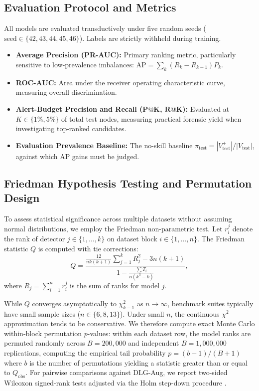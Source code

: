 \documentclass[11pt,a4paper]{article}
\begin{document}
\subsection{Evaluation Protocol and Metrics}
All models are evaluated transductively under five random seeds ($\text{seed} \in \{42, 43, 44, 45, 46\}$). Labels are strictly withheld during training.
\begin{itemize}
    \item \textbf{Average Precision (PR-AUC):} Primary ranking metric, particularly sensitive to low-prevalence imbalances: $\mathrm{AP} = \sum_k (R_k - R_{k-1}) P_k$.
    \item \textbf{ROC-AUC:} Area under the receiver operating characteristic curve, measuring overall discrimination.
    \item \textbf{Alert-Budget Precision and Recall ($\mathbf{P@K}$, $\mathbf{R@K}$):} Evaluated at $K \in \{1\%, 5\%\}$ of total test nodes, measuring practical forensic yield when investigating top-ranked candidates.
    \item \textbf{Evaluation Prevalence Baseline:} The no-skill baseline $\pi_{\mathrm{test}} = |V_{\mathrm{test}}^+| / |V_{\mathrm{test}}|$, against which AP gains must be judged.
\end{itemize}

\subsection{Friedman Hypothesis Testing and Permutation Design}
To assess statistical significance across multiple datasets without assuming normal distributions, we employ the Friedman non-parametric test. Let $r_i^j$ denote the rank of detector $j \in \{1, \dots, k\}$ on dataset block $i \in \{1, \dots, n\}$. The Friedman statistic $Q$ is computed with tie corrections:
\begin{equation}
Q = \frac{\frac{12}{n k (k+1)} \sum_{j=1}^k R_j^2 - 3 n (k+1)}{1 - \frac{\sum T_i}{n(k^3 - k)}},
\label{eq:friedman_q}
\end{equation}
where $R_j = \sum_{i=1}^n r_i^j$ is the sum of ranks for model $j$. 

While $Q$ converges asymptotically to $\chi^2_{k-1}$ as $n \to \infty$, benchmark suites typically have small sample sizes ($n \in \{6, 8, 13\}$). Under small $n$, the continuous $\chi^2$ approximation tends to be conservative. We therefore compute exact Monte Carlo within-block permutation $p$-values: within each dataset row, the model ranks are permuted randomly across $B=200,000$ and independent $B=1,000,000$ replications, computing the empirical tail probability $p = (b + 1) / (B + 1)$ where $b$ is the number of permutations yielding a statistic greater than or equal to $Q_{\mathrm{obs}}$. For pairwise comparisons against DLG-Aug, we report two-sided Wilcoxon signed-rank tests adjusted via the Holm step-down procedure \cite{holm1979}.
\end{document}
